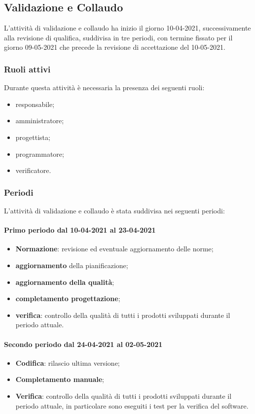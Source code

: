 \newpage 

\subsection{Validazione e Collaudo} 
L'attività di validazione e collaudo ha inizio il giorno 10-04-2021, successivamente alla revisione di 
qualifica, suddivisa in tre periodi, con termine fissato per il giorno 09-05-2021 che precede la revisione di accettazione del 10-05-2021. 

\subsubsection{Ruoli attivi} 
Durante questa attività è necessaria la presenza dei seguenti ruoli: 
\begin{itemize} 
	\item responsabile; 
	\item amministratore; 
	\item progettista; 
	\item programmatore; 
	\item verificatore.
\end{itemize} 

\subsubsection{Periodi} 
L'attività di validazione e collaudo è stata suddivisa nei seguenti periodi: 
\paragraph{Primo periodo dal 10-04-2021 al 23-04-2021} 
\begin{itemize} 
	\item \textbf{Normazione}: revisione ed eventuale aggiornamento delle norme; 
	\item \textbf{aggiornamento} della pianificazione; 
	\item \textbf{aggiornamento della qualità}; 
	\item \textbf{completamento progettazione}; 
	\item \textbf{verifica}: controllo della qualità di tutti i prodotti sviluppati durante il periodo attuale. 
\end{itemize} 

\paragraph{Secondo periodo dal 24-04-2021 al 02-05-2021} 
\begin{itemize} 
	\item \textbf{Codifica}: rilascio ultima versione; 
	\item \textbf{Completamento manuale}; 
	\item \textbf{Verifica}: controllo della qualità di tutti i prodotti sviluppati durante il periodo attuale, in 
	particolare sono eseguiti i test per la verifica del software. 
\end{itemize} 


